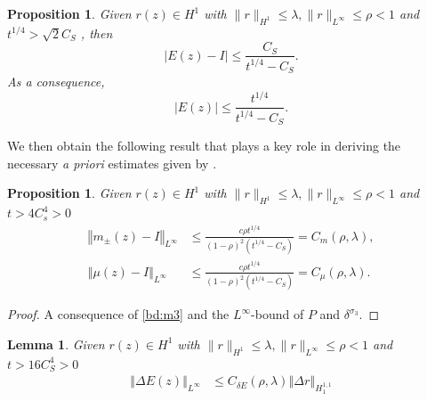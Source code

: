 \documentclass{amsart}
\theoremstyle{plain}
\newtheorem{lemma}[theorem]{Lemma}
\newtheorem{proposition}[theorem]{Proposition}
\theoremstyle{remark}
\numberwithin{equation}{section}
\newcommand{\norm}[2]{\left\Vert #1\right\Vert_{#2}}
\begin{document}
\begin{proposition}
    Given $r(z)\in H^{1}$ with $\|r\|_{H^{1}} \leqslant \lambda,\|r\|_{L^{\infty}} \leqslant \rho<1$ and $t^{1/4}>\sqrt{2}C_S$ , then
    \begin{equation}
     \left\vert  E(z)-I\right\vert\leq \frac{C_S}{t^{1/4}-C_S} .
    \end{equation}
    As a consequence, 
    \begin{equation}
    \label{bd:m3}
         \left\vert  E(z)\right\vert \leq \frac{t^{1/4}}{t^{1/4}-C_S}.
          \end{equation}
\end{proposition}
We then obtain the following result that plays a key role in deriving the necessary \textit{a priori} estimates given by \cite{DZ-2}.
\begin{proposition}
\label{prop:mbound1}
  Given $r(z)\in H^{1}$ with $\|r\|_{H^1} \leqslant \lambda, \|r\|_{L^{\infty}} \leqslant \rho<1$ and $t>4C_s^4>0$
    \begin{align}
        \norm{m_\pm(z)-I}{L^\infty}&\leq   \frac{c\rho t^{1/4}}{(1-\rho)^2(t^{1/4}-C_S)}=C_m(\rho, \lambda), \\
        \norm{\mu(z)-I}{L^\infty}&\leq  \frac{c \rho t^{1/4}}{(1-\rho)^2(t^{1/4}-C_S)}=C_\mu(\rho, \lambda).
        \end{align}
\end{proposition}
\begin{proof}
    A consequence of \eqref{bd:m3} and the $L^\infty$-bound of $P$ and $\delta^{\sigma_3}$.
\end{proof}
\begin{lemma}
\label{lm:ED}
    Given $r(z)\in H^{1}$ with $\|r\|_{H^{1}} \leqslant \lambda,\|r\|_{L^{\infty}} \leqslant \rho<1$ and $t>16C_S^4>0$
    \begin{align}
        \norm{\Delta E(z)}{L^\infty}&\leq C_{\delta E}(\rho, \lambda)\norm{\Delta r}{H^{1,1}_1}
    \end{align}
\end{lemma}
\end{document}
